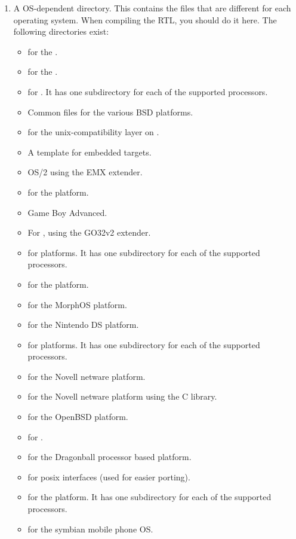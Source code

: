 \begin{enumerate}
\item A OS-dependent directory. This contains the files that are different for
each operating system. When compiling the RTL, you should do it here. The
following directories exist:
\begin{itemize}
\item {} for the \amiga.
\item {} for the \atari.
\item {}  for \beos. 
It has one subdirectory for each of the supported processors.
\item {} Common files for the various BSD platforms.
\item {} for the unix-compatibility layer on \macos.
\item {} A template for embedded targets.
\item {} OS/2 using the EMX extender.
\item {} for the \freebsd platform.
\item {} Game Boy Advanced.
\item {} For \dos, using the GO32v2 extender.
\item {} for \linux platforms. It has one subdirectory for each of the supported
processors.
\item {} for the \macos platform. 
\item {} for the MorphOS platform. 
\item {} for the Nintendo DS platform.
\item {} for \netbsd platforms. It has one subdirectory for each of the supported
processors.
\item {} for the Novell netware platform.
\item {} for the Novell netware platform using the C library.
\item {} for the OpenBSD platform.
\item {} for \ostwo.
\item {} for the \palmos Dragonball processor based platform.
\item {} for posix interfaces (used for easier porting).
\item {} for the \solaris platform. It has one subdirectory for each of the supported
processors.
\item {} for the symbian mobile phone OS.

\end{itemize}
\end{enumerate}
